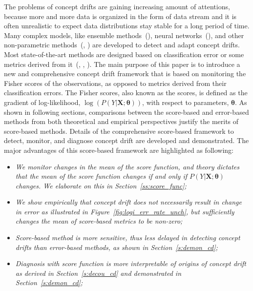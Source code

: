 \documentclass[twoside,11pt]{article}
\begin{document}
The problems of concept drifts are gaining increasing amount of attentions, because more and more data is organized in the form of data stream and it is often unrealistic to expect data distributions stay stable for a long period of time. Many complex models, like ensemble methods~(\cite{wang2003mining}), neural networks~(\cite{calandra2012learning}), and other non-parametric methods~(\cite{dos2016fast}, \cite{frias2015online}) are developed to detect and adapt concept drifts. Most state-of-the-art methods are designed based on classification error or some metrics derived from it~(\cite{barros2018large}, \cite{ross2012exponentially}, \cite{gonccalves2014comparative}). The main purpose of this paper is to introduce a new and comprehensive concept drift framework that is based on monitoring the Fisher scores of the observations, as opposed to metrics derived from their classification errors. The Fisher scores, also known as the scores, is defined as the gradient of log-likelihood, $\log(P(Y|\bm{X};\bm{\theta}))$, with respect to parameters, $\bm{\theta}$. As shown in following sections, comparisons between the score-based and error-based methods from both theoretical and empirical perspectives justify the merits of score-based methods. Details of the comprehensive score-based framework to detect, monitor, and diagnose concept drift are developed and demonstrated. The major advantages of this score-based framework are highlighted as following:

\begin{itemize}
\item
\textit{We monitor changes in the mean of the score function, and theory dictates that the mean of the score function changes if and only if $P(Y|\bm{X};\bm{\theta})$ changes. We elaborate on this in Section~\ref{ss:score_func};}
\item
\textit{We show empirically that concept drift does not necessarily result in change in error as illustrated in Figure~\ref{fig:logi_err_rate_unch}, but sufficiently changes the mean of score-based metrics to be non-zero;}
\item
\textit{Score-based method is more sensitive, thus less delayed in detecting concept drifts than error-based methods, as shown in Section~\ref{s:demon_cd};}
\item
\textit{Diagnosis with score function is more interpretable of origins of concept drift as derived in Section~\ref{s:decou_cd} and demonstrated in Section~\ref{s:demon_cd};}
\end{itemize}
\end{document}
